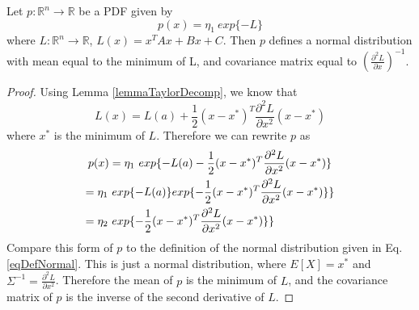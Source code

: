 \begin{lemma} 
	\label{lemmaHessianInverse}
	Let \(p: \mathbb{R}^n \to \mathbb{R}\) be a PDF given by \[
	p(x) = \eta_1\ exp\{ - L \}
	\]
	where \(L: \mathbb{R}^n \to \mathbb{R}\), \(L(x) = x^T Ax + Bx + C\). Then \(p\) defines a normal distribution with mean equal to the minimum of L, and covariance matrix equal to \((\frac{\partial^2 L}{\partial x})^{-1}\).
\end{lemma}
\begin{proof}
	Using Lemma \ref{lemmaTaylorDecomp}, we know that \[
	L(x) = L(a) + \frac{1}{2} (x-x^*)^T \frac{\partial^2 L}{\partial x^2} (x-x^*)
	\] where \(x^*\) is the minimum of \(L\).
	Therefore we can rewrite \(p\) as
	\begin{multline*}
	p(x) = \eta_1\ exp\{ -L(a) - \frac{1}{2} (x-x^*)^T \frac{\partial^2 L}{\partial x^2} (x-x^*)\} \\
	= \eta_1\ exp \{ -L(a) \} exp \{ - \frac{1}{2} (x-x^*)^T \frac{\partial^2 L}{\partial x^2} (x-x^*)\} \} \\
	= \eta_2\ exp \{ - \frac{1}{2} (x-x^*)^T \frac{\partial^2 L}{\partial x^2} (x-x^*)\} \} \hfill
	\end{multline*}
	Compare this form of \(p\) to the definition of the normal distribution given in Eq. \ref{eqDefNormal}. This is just a normal distribution, where \(E[X] = x^*\) and \(\Sigma^{-1} = \frac{\partial^2 L}{\partial x^2}\). Therefore the mean of \(p\) is the minimum of \(L\), and the covariance matrix of \(p\) is the inverse of the second derivative of \(L\). 
\end{proof}


